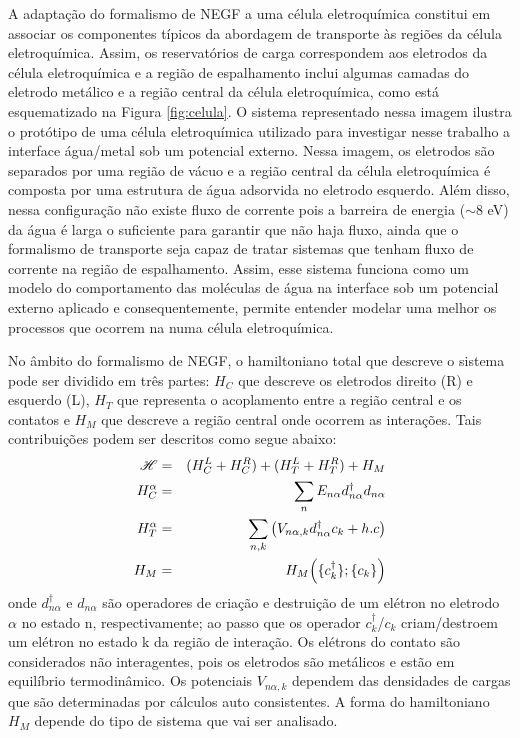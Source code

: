 A adaptação do formalismo de NEGF a uma célula eletroquímica constitui em associar os componentes típicos da abordagem de transporte às regiões da célula eletroquímica. Assim, os reservatórios de carga correspondem aos eletrodos da célula eletroquímica e a região de espalhamento inclui algumas camadas do eletrodo metálico e a região central da célula eletroquímica, como está esquematizado na Figura \ref{fig:celula}. O sistema representado nessa imagem ilustra o protótipo de uma célula eletroquímica utilizado para investigar nesse trabalho a interface água/metal sob um potencial externo. Nessa imagem, os eletrodos são separados por uma região de vácuo e a região central da célula eletroquímica é composta por uma estrutura de água adsorvida no eletrodo esquerdo. Além disso, nessa configuração não existe fluxo de corrente pois a barreira de energia ($ \sim8 $ eV) da água é larga o suficiente para garantir que não haja fluxo, ainda que o formalismo de transporte seja capaz de tratar sistemas que tenham fluxo de corrente na região de espalhamento. Assim, esse sistema funciona como um modelo do comportamento das moléculas de água na interface sob um potencial externo aplicado e consequentemente, permite entender modelar uma  melhor os processos que ocorrem na numa célula eletroquímica.





No âmbito do formalismo de NEGF, o hamiltoniano total que descreve o sistema pode ser dividido em três partes: $H_C$ que descreve os eletrodos direito (R) e esquerdo (L), $H_T$ que representa o acoplamento entre a região central e os contatos e $H_M$ que descreve a região central onde ocorrem as interações. Tais contribuições podem ser descritos como segue abaixo:
\begin{eqnarray}
	\ham&=&(H_C^L+H_C^R)+(H_T^L+H_T^R)+H_M \\    
	H^{\alpha}_C&=&\sum_n E_{n\alpha} d^{\dagger}_{n\alpha} d_{n\alpha} \\
	H^{\alpha}_T&=&\sum_{n,k}\pqty{V_{n\alpha,k} d^{\dagger}_{n\alpha}c_k+h.c}\\
	H_M&=&H_M\pqty{\{ c^{\dagger}_k\};\{c_k\}}
\end{eqnarray}
onde $d^{\dagger}_{n\alpha}$ e $d_{n\alpha}$ são operadores de criação e destruição de um elétron no eletrodo $\alpha$ no estado n, respectivamente; ao passo que os operador $c^{\dagger}_k$/$c_k$ criam/destroem um elétron no estado k da região de interação. Os elétrons do contato são considerados não interagentes, pois os eletrodos são metálicos e estão em equilíbrio termodinâmico. Os potenciais $V_{n\alpha,k}$ dependem das densidades de cargas que são determinadas por cálculos auto consistentes. A forma do hamiltoniano $H_M$ depende do tipo de sistema que vai ser analisado.

